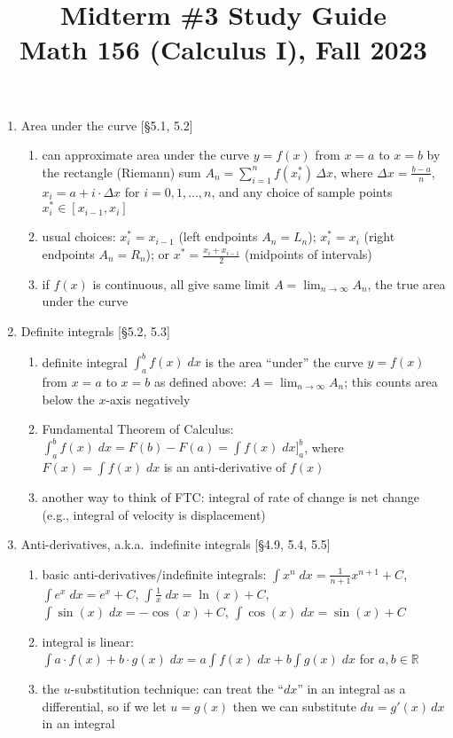 \documentclass[11pt]{article}
\title{Midterm \#3 Study Guide \\ Math 156 (Calculus I), Fall 2023}
\date{}
\begin{document}
\maketitle

\pagestyle{empty}
\thispagestyle{empty}


\begin{enumerate}

\item Area under the curve [\S 5.1, 5.2]
\begin{enumerate}
\item can approximate area under the curve $y=f(x)$ from $x=a$ to $x=b$ by the rectangle (Riemann) sum $A_n = \sum_{i=1}^{n} f(x^{*}_i) \, \Delta x$, where $\Delta x = \frac{b-a}{n}$, $x_i = a + i \cdot \Delta x$ for $i=0,1,\ldots,n$, and any choice of sample points $x^*_i \in [x_{i-1},x_i]$
\item usual choices: $x^*_i = x_{i-1}$ (left endpoints $A_n =L_n$); $x^*_i=x_i$ (right endpoints $A_n=R_n$); or $x^* = \frac{x_i+x_{i-1}}{2}$ (midpoints of intervals)
\item if $f(x)$ is continuous, all give same limit $A=\lim_{n\to \infty} A_n$, the true area under the curve
\end{enumerate}

\item Definite integrals [\S 5.2, 5.3]
\begin{enumerate}
\item definite integral $\int_{a}^{b} f(x) \; dx$ is the area ``under'' the curve $y=f(x)$ from $x=a$ to $x=b$ as defined above: $A=\lim_{n\to \infty} A_n$; this counts area below the $x$-axis negatively
\item Fundamental Theorem of Calculus: $\int_{a}^{b} f(x) \; dx = F(b)-F(a) =\int f(x) \; dx \big ]_{a}^{b}$, where $F(x) = \int f(x) \; dx$ is an anti-derivative of $f(x)$ 
\item another way to think of FTC: integral of rate of change is net change (e.g., integral of velocity is displacement)
\end{enumerate}

\item Anti-derivatives, a.k.a.~indefinite integrals [\S 4.9, 5.4, 5.5]
\begin{enumerate}
\item basic anti-derivatives/indefinite integrals: $\int x^n \; dx = \frac{1}{n+1}x^{n+1}+C$, $\int e^x \; dx = e^x + C$, $\int \frac{1}{x} \; dx = \ln(x) + C$, $\int \sin(x) \; dx = -\cos(x) +C$, $\int \cos(x) \; dx = \sin(x) + C$
\item integral is linear: $\int a\cdot f(x) + b\cdot g(x) \; dx = a\int f(x) \; dx + b \int g(x) \; dx$ for $a,b\in \mathbb{R}$
\item the $u$-substitution technique: can treat the ``$dx$'' in an integral as a differential, so if we let $u=g(x)$ then we can substitute $du = g'(x) \, dx$ in an integral
\end{enumerate}

\end{enumerate}
\end{document}
